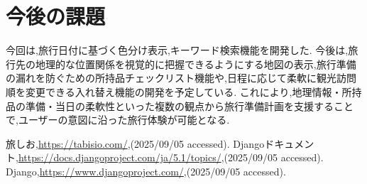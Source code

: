 \documentclass[a4j,twocolumn]{jsarticle}
\begin{document}
\section{今後の課題}
\label{sec:orgf534867}
今回は,旅行日付に基づく色分け表示,キーワード検索機能を開発した.
今後は,旅行先の地理的な位置関係を視覚的に把握できるようにする地図の表示,旅行準備の漏れを防ぐための所持品チェックリスト機能や,日程に応じて柔軟に観光訪問順を変更できる入れ替え機能の開発を予定している.
これにより,地理情報・所持品の準備・当日の柔軟性といった複数の観点から旅行準備計画を支援することで,ユーザーの意図に沿った旅行体験が可能となる.



\small\setlength\baselineskip{10pt}
\begin{thebibliography}{9}

 旅しお,\url{https://tabisio.com/},(2025/09/05 accessed).
Djangoドキュメント,\url{https://docs.djangoproject.com/ja/5.1/topics/},(2025/09/05 accessed).
Django,\url{https://www.djangoproject.com/},(2025/09/05 accessed).
\end{thebibliography}
\end{document}
